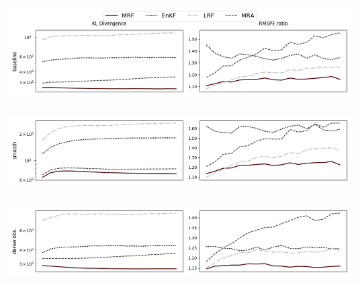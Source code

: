 \documentclass[usenames,dvipsnames,svgnames,table]{beamer}
\begin{document}
\begin{frame}
\begin{figure}
	\begin{subfigure}{1.0\textwidth}
		\includegraphics[trim={0, 3mm, 0, 0}, clip, width=1.0\textwidth]{images/baseline2d.png}
	\end{subfigure}
	\begin{subfigure}{1.0\textwidth}
		\includegraphics[trim={0, 3mm, 0, 5mm}, clip, width=1.0\textwidth]{images/Q_Matern152d.png}
	\end{subfigure}
	\begin{subfigure}{1.0\textwidth}
		\includegraphics[trim={0, 3mm, 0, 5mm}, clip, width=1.0\textwidth]{images/many_obs2d.png}
	\end{subfigure}
	\vspace{-1mm}
	\label{fig:scores-2d}
\end{figure} 
\end{frame}
\end{document}
